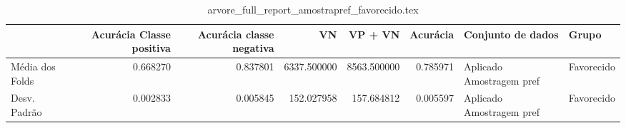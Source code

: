 \begin{table}
\centering
\caption{arvore_full_report_amostrapref_favorecido.tex}
\label{arvore_full_report_amostrapref_favorecido.tex}
\begin{tabular}{lrrrrrll}
\toprule
{}              &  Acurácia Classe positiva &  Acurácia classe negativa &          VN  &     VP + VN  &  Acurácia &         Conjunto de dados &       Grupo \\
\midrule
Média dos Folds &                  0.668270 &                  0.837801 &  6337.500000 &  8563.500000 &  0.785971 &  Aplicado Amostragem pref &  Favorecido \\
Desv. Padrão    &                  0.002833 &                  0.005845 &   152.027958 &   157.684812 &  0.005597 &  Aplicado Amostragem pref &  Favorecido \\
\bottomrule
\end{tabular}
\end{table}
